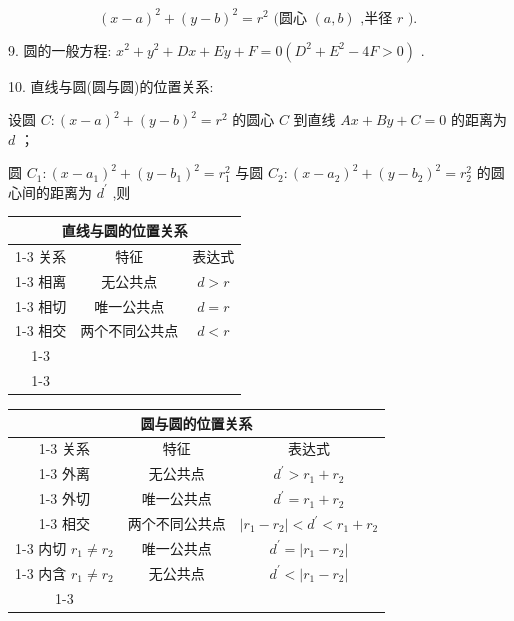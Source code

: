 \[
{\left( x - a\right) }^{2} + {\left( y - b\right) }^{2} = {r}^{2}\text{ (圆心 }\left( {a,b}\right) \text{ ,半径 }r\text{ ). }
\]

9. 圆的一般方程: ${x}^{2} + {y}^{2} + {Dx} + {Ey} + F = 0\left( {{D}^{2} + {E}^{2} - {4F} > 0}\right)$ .

10. 直线与圆(圆与圆)的位置关系:

设圆 $C : {\left( x - a\right) }^{2} + {\left( y - b\right) }^{2} = {r}^{2}$ 的圆心 $C$ 到直线 ${Ax} + {By} + C = 0$ 的距离为 $d$ ；

圆 ${C}_{1} : {\left( x - {a}_{1}\right) }^{2} + {\left( y - {b}_{1}\right) }^{2} = {r}_{1}^{2}$ 与圆 ${C}_{2} : {\left( x - {a}_{2}\right) }^{2} + {\left( y - {b}_{2}\right) }^{2} = {r}_{2}^{2}$ 的圆心间的距离为 ${d}^{\prime }$ ,则

\begin{center}
\begin{tabular}{|c|c|c|}
\hline
\multicolumn{3}{|c|}{直线与圆的位置关系} \\
\cline{1-3}
关系 & 特征 & 表达式 \\
\cline{1-3}
相离 & 无公共点 & $d > r$ \\
\cline{1-3}
相切 & 唯一公共点 & $d = r$ \\
\cline{1-3}
相交 & 两个不同公共点 & $d < r$ \\
\cline{1-3}
\multicolumn{3}{|c|}{也可以利用联立方程组解的个数判断} \\
\cline{1-3}
\hline
\end{tabular}
\end{center}

\begin{center}
\begin{tabular}{|c|c|c|}
\hline
\multicolumn{3}{|c|}{圆与圆的位置关系} \\
\cline{1-3}
关系 & 特征 & 表达式 \\
\cline{1-3}
外离 & 无公共点 & ${d}^{\prime } > {r}_{1} + {r}_{2}$ \\
\cline{1-3}
外切 & 唯一公共点 & ${d}^{\prime } = {r}_{1} + {r}_{2}$ \\
\cline{1-3}
相交 & 两个不同公共点 & $\left| {{r}_{1} - {r}_{2}}\right|  < {d}^{\prime } < {r}_{1} + {r}_{2}$ \\
\cline{1-3}
内切 ${r}_{1} \neq  {r}_{2}$ & 唯一公共点 & ${d}^{\prime } = \left| {{r}_{1} - {r}_{2}}\right|$ \\
\cline{1-3}
内含 ${r}_{1} \neq  {r}_{2}$ & 无公共点 & ${d}^{\prime } < \left| {{r}_{1} - {r}_{2}}\right|$ \\
\cline{1-3}
\hline
\end{tabular}
\end{center}


